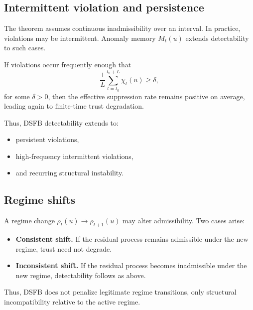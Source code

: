 \documentclass[11pt]{article}
\theoremstyle{definition}
\theoremstyle{plain}
\begin{document}

\subsection{Intermittent violation and persistence}

The theorem assumes continuous inadmissibility over an interval. In practice, violations may be intermittent. Anomaly memory $M_t(u)$ extends detectability to such cases.

If violations occur frequently enough that
\begin{equation}
\frac{1}{L}\sum_{t=t_0}^{t_0+L}\chi_t(u) \ge \delta,
\end{equation}
for some $\delta>0$, then the effective suppression rate remains positive on average, leading again to finite-time trust degradation.

Thus, DSFB detectability extends to:
\begin{itemize}[leftmargin=1.5em]
    \item persistent violations,
    \item high-frequency intermittent violations,
    \item and recurring structural instability.
\end{itemize}


\subsection{Regime shifts}

A regime change $\rho_t(u)\rightarrow \rho_{t+1}(u)$ may alter admissibility. Two cases arise:

\begin{itemize}[leftmargin=1.5em]
    \item \textbf{Consistent shift.} If the residual process remains admissible under the new regime, trust need not degrade.
    \item \textbf{Inconsistent shift.} If the residual process becomes inadmissible under the new regime, detectability follows as above.
\end{itemize}

Thus, DSFB does not penalize legitimate regime transitions, only structural incompatibility relative to the active regime.
\end{document}
